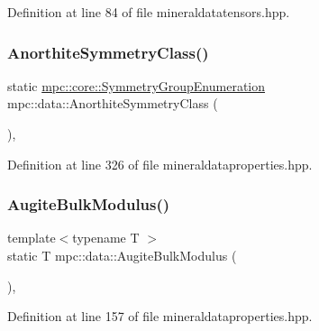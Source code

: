Definition at line 84 of file mineraldatatensors.\+hpp.

\mbox{\label{namespacempc_1_1data_af03565960ef339f19d236479a871e4a5}} 
\subsubsection{\texorpdfstring{Anorthite\+Symmetry\+Class()}{AnorthiteSymmetryClass()}}
{\footnotesize\ttfamily static \mbox{\hyperlink{namespacempc_1_1core_a9d979684062547055a0ef5c13077bad8}{mpc\+::core\+::\+Symmetry\+Group\+Enumeration}} mpc\+::data\+::\+Anorthite\+Symmetry\+Class (\begin{DoxyParamCaption}{ }\end{DoxyParamCaption})\hspace{0.3cm}{\ttfamily [inline]}, {\ttfamily [static]}}



Definition at line 326 of file mineraldataproperties.\+hpp.

\mbox{\label{namespacempc_1_1data_a7ec03e2258275e911854465c3bfd85b0}} 
\subsubsection{\texorpdfstring{Augite\+Bulk\+Modulus()}{AugiteBulkModulus()}}
{\footnotesize\ttfamily template$<$typename T $>$ \\
static T mpc\+::data\+::\+Augite\+Bulk\+Modulus (\begin{DoxyParamCaption}{ }\end{DoxyParamCaption})\hspace{0.3cm}{\ttfamily [inline]}, {\ttfamily [static]}}



Definition at line 157 of file mineraldataproperties.\+hpp.

\mbox{\label{namespacempc_1_1data_a619b6ede8355939ad60b6dbab8dd3011}} 
